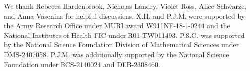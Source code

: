We thank Rebecca Hardenbrook, Nicholas Landry, Violet Ross, Alice Schwarze, and Anna Vasenina for helpful discussions. X.H. and P.J.M. were supported by the Army Research Office under MURI award W911NF-18-1-0244 and the National Institutes of Health FIC under R01-TW011493. P.S.C. was supported by the National Science Foundation Division of Mathematical Sciences under DMS-2407058. P.J.M. was additionally supported by the National Science Foundation under BCS-2140024 and DEB-2308460.